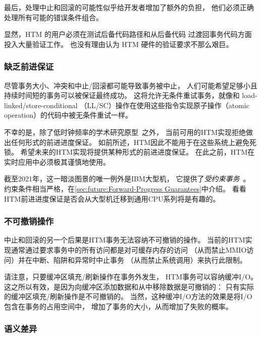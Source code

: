 最后，处理中止和回滚的可能性似乎给开发者增加了额外的负担，
他们必须正确处理所有可能的错误条件组合。

显然，HTM 的用户必须在测试后备代码路径和从后备代码
过渡回事务代码方面投入大量验证工作。
也没有理由认为 HTM 硬件的验证要求不那么艰巨。

\subsubsection{缺乏前进保证}
\label{sec:future:Lack of Forward-Progress Guarantees}

尽管事务大小、冲突和中止/回滚都可能导致事务被中止，
人们可能希望足够小且持续时间短的事务可以被保证最终成功。
这将允许无条件重试事务，就像和 load-linked/store-conditional
（LL/SC）操作在使用这些指令实现原子操作（atomic operation）的代码中被无条件重试一样。

不幸的是，除了低时钟频率的学术研究原型~\cite{MartinSchoeberl2010realtimeTM}之外，
当前可用的HTM实现拒绝做出任何形式的前进进度保证。
如前所述，HTM因此不能用于在这些系统上避免死锁。
希望未来的HTM实现将提供某种形式的前进进度保证。
在此之前，HTM在实时应用中必须极其谨慎地使用。

截至2021年，这一暗淡图景的唯一例外是IBM大型机，
它提供了\emph{受约束事务}~\cite{ChristianJacobi2012MainframeTM}。
约束条件相当严格，在\cref{sec:future:Forward-Progress Guarantees}中介绍。
看看HTM前进进度保证是否会从大型机迁移到通用CPU系列将是有趣的。

\subsubsection{不可撤销操作}
\label{sec:future:Irrevocable Operations}

中止和回滚的另一个后果是HTM事务无法容纳不可撤销的操作。
当前的HTM实现通常通过要求事务中的所有访问都是对可缓存内存的访问
（从而禁止MMIO访问）并在中断、陷阱和异常时中止事务
（从而禁止系统调用）来执行此限制。

请注意，只要缓冲区填充/刷新操作在事务外发生，
HTM事务可以容纳缓冲I/O。
这之所以有效，是因为向缓冲区添加数据和从中移除数据是可撤销的：
只有实际的缓冲区填充/刷新操作是不可撤销的。
当然，这种缓冲I/O方法的效果是将I/O包含在事务的占用空间中，
增加了事务的大小，从而增加了失败的概率。

\subsubsection{语义差异}
\label{sec:future:Semantic Differences}

